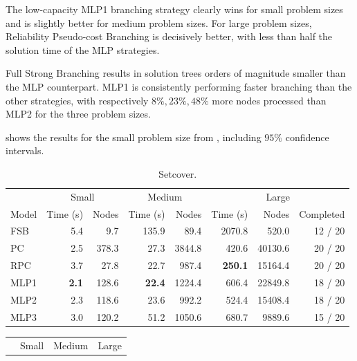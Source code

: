 The low-capacity MLP1 branching strategy clearly wins for small problem sizes and is slightly better for medium problem sizes. For large problem sizes, Reliability Pseudo-cost Branching is decisively better, with less than half the solution time of the \gls{MLP} strategies. 

Full Strong Branching results in solution trees orders of magnitude smaller than the \gls{MLP} counterpart. MLP1 is consistently performing faster branching than the other strategies, with respectively $8 \%, 23 \%, 48 \%$ more nodes processed than MLP2 for the three problem sizes.

 shows the results for the small problem size from , including $95 \%$ confidence intervals.
 
  
\begin{scriptsize}
\begin{table}[ht]
	\centering
	\begin{tabular}{lrrrrrrr}
		\toprule
		& \multicolumn{2}{c}{Small} & \multicolumn{2}{c}{Medium} & \multicolumn{3}{c}{Large}\\ \cmidrule(lr){2-3} \cmidrule(lr){4-5} \cmidrule(lr){6-8}
		Model & Time (s) & Nodes  & Time (s) & Nodes & Time (s) & Nodes & Completed\\
		\midrule
		FSB & 5.4 &  9.7  & 135.9 &  89.4 & 2070.8 &  520.0 & 12 / 20\\
		PC &  2.5 & 378.3  &  27.3 &  3844.8 & 420.6 &  40130.6 & 20 / 20 \\
		RPC &  3.7 & 27.8  &  22.7 &  987.4 & \textbf{250.1} &  15164.4 & 20 / 20 \\
		\addlinespace
		MLP1 & \textbf{2.1} & 128.6 & \textbf{22.4} & 1224.4 & 606.4 & 22849.8 & 18 / 20\\
		MLP2 & 2.3          & 118.6 & 23.6          & 992.2 & 524.4 & 15408.4  & 18 / 20\\
		MLP3 & 3.0          & 120.2 & 51.2          & 1050.6 & 680.7 & 9889.6  & 15 / 20\\
		\bottomrule
	\end{tabular}
	\caption{Setcover.}\label{tab:results1_set}
\end{table}
\begin{table}[ht]
	\centering
	\begin{tabular}{lrrrrrrr}
		\toprule
		& \multicolumn{2}{c}{Small} & \multicolumn{2}{c}{Medium} & \multicolumn{3}{c}{Large}\\ \cmidrule(lr){2-3} \cmidrule(lr){4-5} \cmidrule(lr){6-8}

\end{tabular}
\end{table}
\end{scriptsize}
